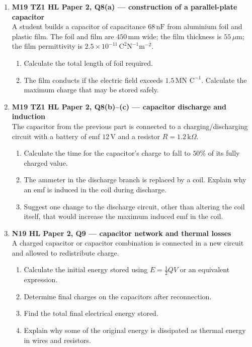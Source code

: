 \documentclass[11pt]{article}
\begin{document}
\begin{enumerate}[leftmargin=*, itemsep=1.2em]
\item \textbf{M19 TZ1 HL Paper 2, Q8(a) --- construction of a parallel-plate capacitor}\\
A student builds a capacitor of capacitance $68\,\text{nF}$ from aluminium foil and plastic film. The foil and film are $450\,\text{mm}$ wide; the film thickness is $55\,\mu\text{m}$; the film permittivity is $2.5\times10^{-11}\,\text{C}^2\text{N}^{-1}\text{m}^{-2}$.
\begin{enumerate}[label=(\alph*)]
\item Calculate the total length of foil required.
\item The film conducts if the electric field exceeds $1.5\,\text{MN C}^{-1}$. Calculate the maximum charge that may be stored safely.
\end{enumerate}

\item \textbf{M19 TZ1 HL Paper 2, Q8(b)--(c) --- capacitor discharge and induction}\\
The capacitor from the previous part is connected to a charging/discharging circuit with a battery of emf $12\,\text{V}$ and a resistor $R=1.2\,\text{k}\Omega$.
\begin{enumerate}[label=(\alph*)]
\item Calculate the time for the capacitor's charge to fall to $50\%$ of its fully charged value.
\item The ammeter in the discharge branch is replaced by a coil. Explain why an emf is induced in the coil during discharge.
\item Suggest one change to the discharge circuit, other than altering the coil itself, that would increase the maximum induced emf in the coil.
\end{enumerate}

\item \textbf{N19 HL Paper 2, Q9 --- capacitor network and thermal losses}\\
A charged capacitor or capacitor combination is connected in a new circuit and allowed to redistribute charge.
\begin{enumerate}[label=(\alph*)]
\item Calculate the initial energy stored using $E=\tfrac12QV$ or an equivalent expression.
\item Determine final charges on the capacitors after reconnection.
\item Find the total final electrical energy stored.
\item Explain why some of the original energy is dissipated as thermal energy in wires and resistors.
\end{enumerate}


\end{enumerate}
\end{document}
